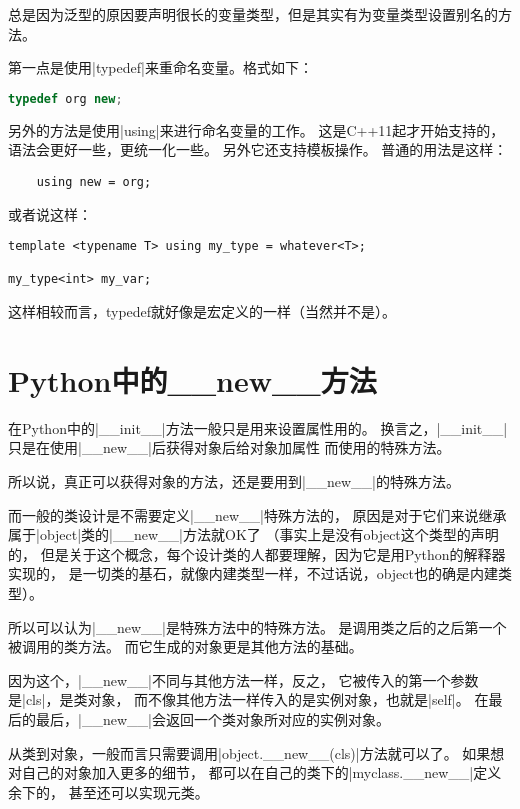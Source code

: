 总是因为泛型的原因要声明很长的变量类型，但是其实有为变量类型设置别名的方法。

第一点是使用\vb|typedef|来重命名变量。格式如下：

\begin{lstlisting}[language=C++]
    typedef org new;
\end{lstlisting}

另外的方法是使用\vb|using|来进行命名变量的工作。
这是C++11起才开始支持的，语法会更好一些，更统一化一些。
另外它还支持模板操作。
普通的用法是这样：

\begin{lstlisting}
    using new = org;
\end{lstlisting}

或者说这样：

\begin{lstlisting}
template <typename T> using my_type = whatever<T>;

my_type<int> my_var;
\end{lstlisting}

这样相较而言，typedef就好像是宏定义的一样（当然并不是）。


\section{Python中的\_\_new\_\_方法}

在Python中的\vb|__init__|方法一般只是用来设置属性用的。
换言之，\vb|__init__|只是在使用\vb|__new__|后获得对象后给对象加属性
而使用的特殊方法。

所以说，真正可以获得对象的方法，还是要用到\vb|__new__|的特殊方法。

而一般的类设计是不需要定义\vb|__new__|特殊方法的，
原因是对于它们来说继承属于\vb|object|类的\vb|__new__|方法就OK了
（事实上是没有object这个类型的声明的，
但是关于这个概念，每个设计类的人都要理解，因为它是用Python的解释器实现的，
是一切类的基石，就像内建类型一样，不过话说，object也的确是内建类型）。

所以可以认为\vb|__new__|是特殊方法中的特殊方法。
是调用类之后的之后第一个被调用的类方法。
而它生成的对象更是其他方法的基础。

因为这个，\vb|__new__|不同与其他方法一样，反之，
它被传入的第一个参数是\vb|cls|，是类对象，
而不像其他方法一样传入的是实例对象，也就是\vb|self|。
在最后的最后，\vb|__new__|会返回一个类对象所对应的实例对象。

从类到对象，一般而言只需要调用\vb|object.__new__(cls)|方法就可以了。
如果想对自己的对象加入更多的细节，
都可以在自己的类下的\vb|myclass.__new__|定义余下的，
甚至还可以实现元类。

